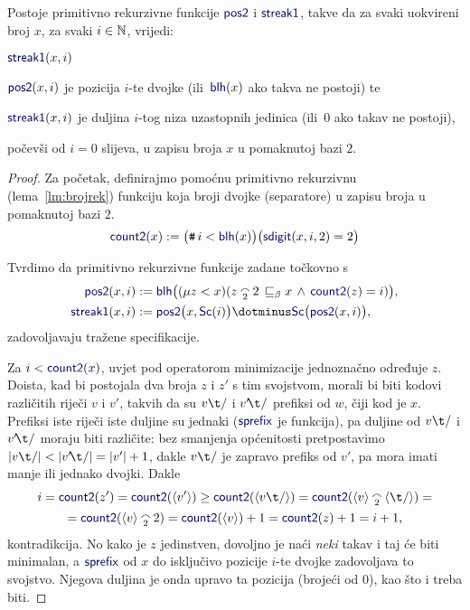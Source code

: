 \begin{lema}[{name=[primitivna rekurzivnost raščlambe binarnih zapisa]}]\label{lm:pos2streak1prn}
Postoje primitivno rekurzivne funkcije $\f{pos2}$ i $\f{streak1}$, takve da za svaki uokvireni broj $x$, za svaki $i\in{\mathbb N}$, vrijedi:
\begin{labeling}{$\f{streak1}(x,i)$}
    \item[$\f{pos2}(x,i)$] je pozicija $i$-te dvojke (ili\, $\f{blh}(x)$ ako takva ne postoji) te
    \item[$\f{streak1}(x,i)$] je duljina $i$-tog niza uzastopnih jedinica (ili\, $0$ ako takav ne postoji),
\end{labeling}
počevši od $i=0$ slijeva, u zapisu broja $x$ u pomaknutoj bazi $2$.
\end{lema}
\begin{proof}
Za početak, definirajmo pomoćnu primitivno rekurzivnu (lema~\ref{lm:brojrek}) funkciju koja broji dvojke (separatore) u zapisu broja u pomaknutoj bazi $2$.
\begin{equation}
    \f{count2}(x):=\bigl(\num i<\f{blh}(x)\bigr)\bigl(\f{sdigit}(x,i,2)=2\bigr)
\end{equation}

Tvrdimo da primitivno rekurzivne funkcije zadane točkovno s
\begin{align}
    \f{pos2}(x,i)&:=\f{blh}\bigl((\mu z<x)(z\conc22\,\sqsubseteq_\beta x\,\land\,\f{count2}(z)=i)\bigr),\\
    \f{streak1}(x,i)&:=\f{pos2}\bigl(x,\f{Sc}(i)\bigr)\dotminus\f{Sc}\bigl(\f{pos2}(x,i)\bigr),
\end{align}
zadovoljavaju tražene specifikacije.

Za $i<\f{count2}(x)$, uvjet pod operatorom minimizacije jednoznačno određuje $z$. Doista, kad bi postojala dva broja $z$ i $z'$ s tim svojstvom, morali bi biti kodovi različitih riječi $v$ i $v'$, takvih da su $v\t/$ i $v'\!\t/$ prefiksi od $w$, čiji kod je $x$. Prefiksi iste riječi iste duljine su jednaki ($\f{sprefix}$ je funkcija), pa duljine od $v\t/$ i $v'\!\t/$ moraju biti različite: bez smanjenja općenitosti pretpostavimo $\dulj{v\t/}<\dulj{v'\!\t/}=\dulj{v'}+1$, dakle $v\t/$ je zapravo prefiks od $v'$, pa mora imati manje ili jednako dvojki. Dakle
\begin{multline}
    i=\f{count2}(z')=\f{count2}(\kr{v'})\ge\f{count2}(\kr{v\t/})=\f{count2}(\kr v\conc2\kr{\t/})=\\
    =\f{count2}(\kr v\conc22)=\f{count2}(\kr v)+1=\f{count2}(z)+1=i+1\text,
\end{multline}
    kontradikcija. No kako je $z$ jedinstven, dovoljno je naći \emph{neki} takav i taj će biti minimalan, a $\f{sprefix}$ od $x$ do isključivo pozicije $i$-te dvojke zadovoljava to svojstvo. Njegova duljina je onda upravo ta pozicija (brojeći od $0$), kao što i treba biti.


\end{proof}
